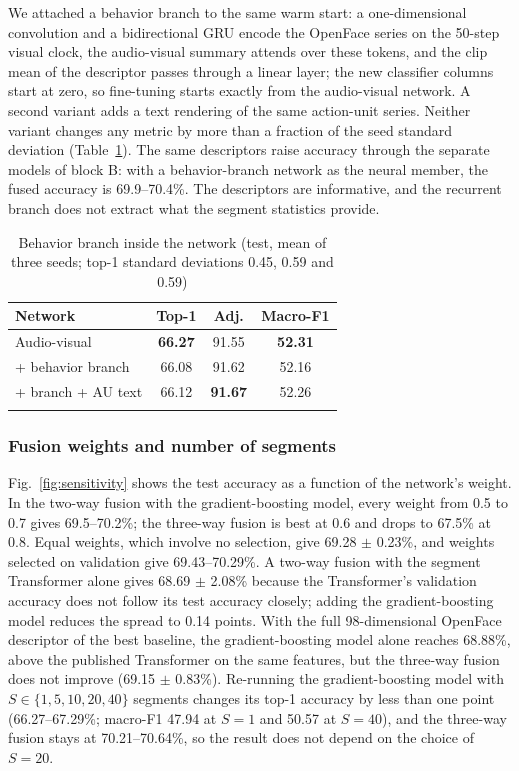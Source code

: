 \documentclass[pdflatex,iicol,sn-basic]{sn-jnl}
\begin{document}
We attached a behavior branch to the same warm start: a one-dimensional convolution and a bidirectional GRU encode the OpenFace series on the 50-step visual clock, the audio-visual summary attends over these tokens, and the clip mean of the descriptor passes through a linear layer; the new classifier columns start at zero, so fine-tuning starts exactly from the audio-visual network. A second variant adds a text rendering of the same action-unit series. Neither variant changes any metric by more than a fraction of the seed standard deviation (Table~\ref{tab:branch}). The same descriptors raise accuracy through the separate models of block B: with a behavior-branch network as the neural member, the fused accuracy is 69.9--70.4\%. The descriptors are informative, and the recurrent branch does not extract what the segment statistics provide.

\begin{table}[t]
\caption{Behavior branch inside the network (test, mean of three seeds; top-1 standard deviations 0.45, 0.59 and 0.59)}\label{tab:branch}
\begin{tabular*}{\columnwidth}{@{\extracolsep\fill}lccc}
\toprule
Network & Top-1 & Adj. & Macro-F1\\
\midrule
Audio-visual & \textbf{66.27} & 91.55 & \textbf{52.31}\\
+ behavior branch & 66.08 & 91.62 & 52.16\\
+ branch + AU text & 66.12 & \textbf{91.67} & 52.26\\
\botrule
\end{tabular*}
\end{table}

\subsubsection{Fusion weights and number of segments}\label{sec:abl_fusion}

Fig.~\ref{fig:sensitivity} shows the test accuracy as a function of the network's weight. In the two-way fusion with the gradient-boosting model, every weight from 0.5 to 0.7 gives 69.5--70.2\%; the three-way fusion is best at 0.6 and drops to 67.5\% at 0.8. Equal weights, which involve no selection, give 69.28 $\pm$ 0.23\%, and weights selected on validation give 69.43--70.29\%. A two-way fusion with the segment Transformer alone gives 68.69 $\pm$ 2.08\% because the Transformer's validation accuracy does not follow its test accuracy closely; adding the gradient-boosting model reduces the spread to 0.14 points. With the full 98-dimensional OpenFace descriptor of the best baseline, the gradient-boosting model alone reaches 68.88\%, above the published Transformer on the same features, but the three-way fusion does not improve (69.15 $\pm$ 0.83\%). Re-running the gradient-boosting model with $S \in \{1, 5, 10, 20, 40\}$ segments changes its top-1 accuracy by less than one point (66.27--67.29\%; macro-F1 47.94 at $S = 1$ and 50.57 at $S = 40$), and the three-way fusion stays at 70.21--70.64\%, so the result does not depend on the choice of $S = 20$.
\end{document}
